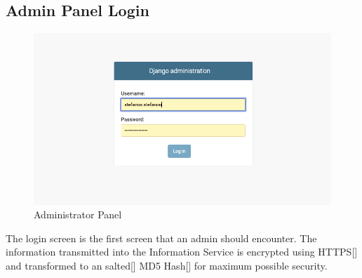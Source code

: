 		\subsection{Admin Panel Login}
			\begin{figure}[H]
				\iftrue
				\caption{Administrator Panel}
				\centering
				\includegraphics[scale=0.3]{figures/admin-panel-login}
				\fi
			\end{figure}
			The login screen is the first screen that an admin should encounter. The information transmitted into the Information Service
			is encrypted using HTTPS[\cite{rfc2818}] and transformed to an salted[\cite{MANBER1996171}] MD5 Hash[\cite{rfc1321}] for maximum 
			possible security.
